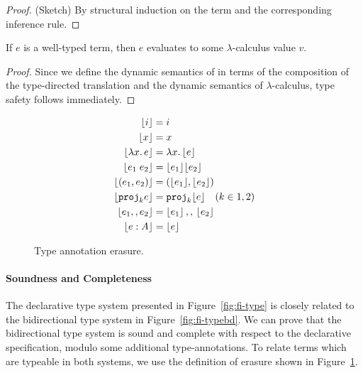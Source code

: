 \begin{proof}
  (Sketch) By structural induction on the term and the corresponding
  inference rule.
\end{proof}

\begin{theorem}
  If $e$ is a well-typed \name term, then $e$ evaluates to some $\lambda$-calculus
  value $v$.
\end{theorem}

\begin{proof}
  Since we define the dynamic semantics of \name in terms of the composition of
  the type-directed translation and the dynamic semantics of $\lambda$-calculus, type safety follows immediately.
\end{proof}

\begin{figure}[t]
  \begin{align*}
    \lfloor i \rfloor                   &= i \\
    \lfloor x \rfloor                   &= x \\
    \lfloor \lambda x.\, e \rfloor            &= \lambda x.\, \lfloor e \rfloor \\
    \lfloor e_1 \; e_2 \rfloor    &= {\lfloor e_1 \rfloor} {\lfloor e_2 \rfloor} \\
    \lfloor (e_1, e_2) \rfloor   &= (\lfloor e_1 \rfloor, \lfloor e_2 \rfloor) \\
    \lfloor {\texttt{proj}}_{k} e \rfloor           &= {\texttt{proj}}_{k} \lfloor e \rfloor \quad (k \in {1,2}) \\ 
    \lfloor {e_1} ,, {e_2} \rfloor      &= {\lfloor e_1 \rfloor} \, ,, \, {\lfloor e_2 \rfloor} \\
    \lfloor e : A \rfloor               &= {\lfloor e \rfloor} 
  \end{align*}
  \caption{Type annotation erasure.}
  \label{fig:type-ann-erasure}
\end{figure}

\paragraph{Soundness and Completeness} The declarative type system presented in
Figure~\ref{fig:fi-type} is closely related to the bidirectional type system 
in Figure~\ref{fig:fi-typebd}. We can prove that the bidirectional type system 
is sound and complete with respect to the declarative specification, 
modulo some additional type-annotations. To relate terms which are
typeable in both systems, we use the definition of erasure shown in Figure~\ref{fig:type-ann-erasure}.

